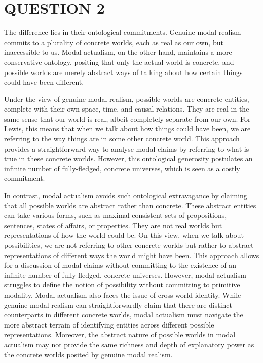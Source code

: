 \section*{QUESTION 2}
The difference lies in their ontological commitments. Genuine modal realism commits to a plurality of concrete worlds, each as real as our own, but inaccessible to us. Modal actualism, on the other hand, maintains a more conservative ontology, positing that only the actual world is concrete, and possible worlds are merely abstract ways of talking about how certain things could have been different.

Under the view of genuine modal realism, possible worlds are concrete entities, complete with their own space, time, and causal relations. They are real in the same sense that our world is real, albeit completely separate from our own. For Lewis, this means that when we talk about how things could have been, we are referring to the way things are in some other concrete world. This approach provides a straightforward way to analyse modal claims by referring to what is true in these concrete worlds. However, this ontological generosity postulates an infinite number of fully-fledged, concrete universes, which is seen as a costly commitment.

In contrast, modal actualism avoids such ontological extravagance by claiming that all possible worlds are abstract rather than concrete. These abstract entities can take various forms, such as maximal consistent sets of propositions, sentences, states of affairs, or properties. They are not real worlds but representations of how the world could be. On this view, when we talk about possibilities, we are not referring to other concrete worlds but rather to abstract representations of different ways the world might have been. This approach allows for a discussion of modal claims without committing to the existence of an infinite number of fully-fledged, concrete universes. However, modal actualism struggles to define the notion of possibility without committing to primitive modality. Modal actualism also faces the issue of cross-world identity. While genuine modal realism can straightforwardly claim that there are distinct counterparts in different concrete worlds, modal actualism must navigate the more abstract terrain of identifying entities across different possible representations. Moreover, the abstract nature of possible worlds in modal actualism may not provide the same richness and depth of explanatory power as the concrete worlds posited by genuine modal realism.
